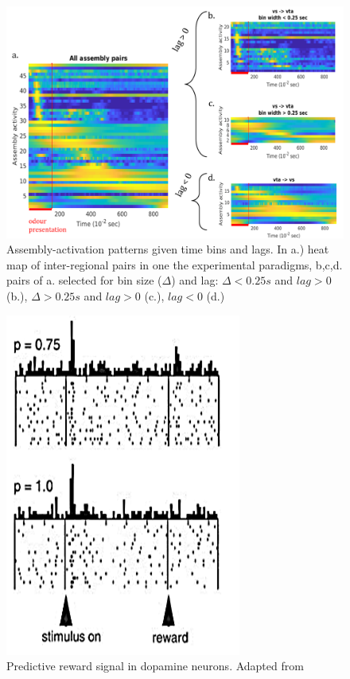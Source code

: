 \begin{figure}[h!]
    \centering
    \includegraphics[scale=0.6]{figures/AsActPerBinLag1.png}
    \caption{Assembly-activation patterns given time bins and lags. In a.) heat map of inter-regional pairs in one the experimental paradigms, b,c,d. pairs of a. selected for bin size ($\Delta$) and lag: $\Delta < 0.25 s$ and $lag > 0$ (b.), $\Delta > 0.25 s$ and $lag > 0$ (c.), $lag < 0$ (d.)}
    \label{fig:AsActBinLag}
\end{figure}
\begin{figure}[h!]
    \centering
    \includegraphics{figures/RewPred1.png}
    \caption{Predictive reward signal in dopamine neurons. Adapted from \cite{Fiorillo}}
    \label{fig:RewPred}
\end{figure}
\pagebreak
